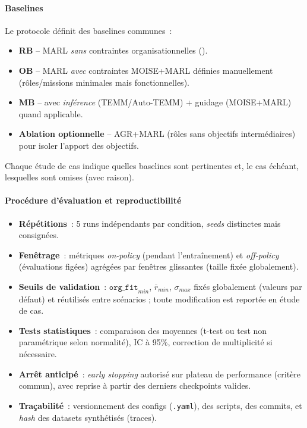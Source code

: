 \paragraph{Baselines}
\label{par:baselines}
Le protocole définit des baselines communes~:
\begin{itemize}
  \item \textbf{RB} -- MARL \textit{sans} contraintes organisationnelles ().
  \item \textbf{OB} -- MARL \textit{avec} contraintes MOISE+MARL définies manuellement (rôles/missions minimales mais fonctionnelles).
  \item \textbf{MB} --  avec \textit{inférence} (TEMM/Auto-TEMM) + guidage (MOISE+MARL) quand applicable.
  \item \textbf{Ablation optionnelle} -- AGR+MARL (rôles sans objectifs intermédiaires) pour isoler l’apport des objectifs.
\end{itemize}
Chaque étude de cas indique quelles baselines sont pertinentes et, le cas échéant, lesquelles sont omises (avec raison).

\paragraph{Procédure d’évaluation et reproductibilité}
\begin{itemize}
  \item \textbf{Répétitions}~: 5 runs indépendants par condition, \textit{seeds} distinctes mais consignées.
  \item \textbf{Fenêtrage}~: métriques \textit{on-policy} (pendant l’entraînement) et \textit{off-policy} (évaluations figées) agrégées par fenêtres glissantes (taille fixée globalement).
  \item \textbf{Seuils de validation}~: $\texttt{org\_fit}_{min}$, $\overline{r}_{min}$, $\sigma_{max}$ fixés globalement (valeurs par défaut) et réutilisés entre scénarios ; toute modification est reportée en étude de cas.
  \item \textbf{Tests statistiques}~: comparaison des moyennes (t-test ou test non paramétrique selon normalité), IC à 95\%, correction de multiplicité si nécessaire.
  \item \textbf{Arrêt anticipé}~: \textit{early stopping} autorisé sur plateau de performance (critère commun), avec reprise à partir des derniers checkpoints valides.
  \item \textbf{Traçabilité}~: versionnement des configs (\texttt{.yaml}), des scripts, des commits, et \textit{hash} des datasets synthétisés (traces).
\end{itemize}

